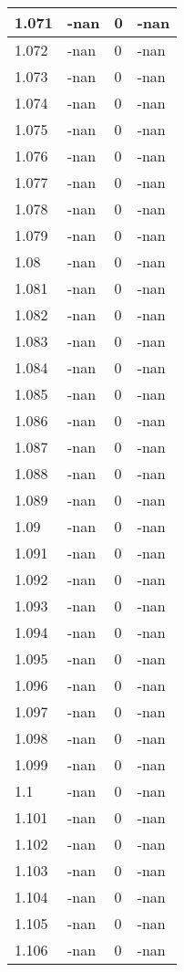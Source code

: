 \documentclass[a4paper,14pt]{extarticle}
\begin{document}
\begin{longtable}{||m{3cm}||m{3cm}|m{3cm}||m{3cm}||}
\hline
1.071 & -nan & 0 & -nan\\
\hline
1.072 & -nan & 0 & -nan\\
\hline
1.073 & -nan & 0 & -nan\\
\hline
1.074 & -nan & 0 & -nan\\
\hline
1.075 & -nan & 0 & -nan\\
\hline
1.076 & -nan & 0 & -nan\\
\hline
1.077 & -nan & 0 & -nan\\
\hline
1.078 & -nan & 0 & -nan\\
\hline
1.079 & -nan & 0 & -nan\\
\hline
1.08 & -nan & 0 & -nan\\
\hline
1.081 & -nan & 0 & -nan\\
\hline
1.082 & -nan & 0 & -nan\\
\hline
1.083 & -nan & 0 & -nan\\
\hline
1.084 & -nan & 0 & -nan\\
\hline
1.085 & -nan & 0 & -nan\\
\hline
1.086 & -nan & 0 & -nan\\
\hline
1.087 & -nan & 0 & -nan\\
\hline
1.088 & -nan & 0 & -nan\\
\hline
1.089 & -nan & 0 & -nan\\
\hline
1.09 & -nan & 0 & -nan\\
\hline
1.091 & -nan & 0 & -nan\\
\hline
1.092 & -nan & 0 & -nan\\
\hline
1.093 & -nan & 0 & -nan\\
\hline
1.094 & -nan & 0 & -nan\\
\hline
1.095 & -nan & 0 & -nan\\
\hline
1.096 & -nan & 0 & -nan\\
\hline
1.097 & -nan & 0 & -nan\\
\hline
1.098 & -nan & 0 & -nan\\
\hline
1.099 & -nan & 0 & -nan\\
\hline
1.1 & -nan & 0 & -nan\\
\hline
1.101 & -nan & 0 & -nan\\
\hline
1.102 & -nan & 0 & -nan\\
\hline
1.103 & -nan & 0 & -nan\\
\hline
1.104 & -nan & 0 & -nan\\
\hline
1.105 & -nan & 0 & -nan\\
\hline
1.106 & -nan & 0 & -nan\\

\end{longtable}
\end{document}
